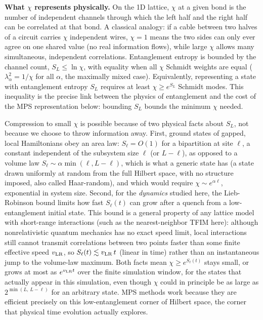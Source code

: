 \documentclass[11pt,a4paper]{article}
\begin{document}
\textbf{What $\chi$ represents physically.} On the 1D lattice, $\chi$ at a
given bond is the number of independent channels through which the left half
and the right half can be correlated at that bond. A classical analogy: if a
cable between two halves of a circuit carries $\chi$ independent wires,
$\chi=1$ means the two sides can only ever agree on one shared value (no real
information flows), while large $\chi$ allows many simultaneous, independent
correlations. Entanglement entropy is bounded by the channel count,
$S_L \leq \ln \chi$, with equality when all $\chi$ Schmidt weights are equal
($\lambda_\alpha^2 = 1/\chi$ for all $\alpha$, the maximally mixed case).
Equivalently, representing a state with entanglement entropy $S_L$ requires
at least $\chi \geq e^{S_L}$ Schmidt modes. This inequality is the precise
link between the physics of entanglement and the cost of the MPS
representation below: bounding $S_L$ bounds the minimum $\chi$ needed.

Compression to small $\chi$ is possible because of two physical facts about
$S_L$, not because we choose to throw information away. First, ground states
of gapped, local Hamiltonians obey an area law: $S_\ell = O(1)$ for a
bipartition at site $\ell$, a constant independent of the subsystem size
$\ell$ (or $L-\ell$), as opposed to a volume law $S_\ell \sim \alpha\min(\ell,
L-\ell)$, which is what a generic state has (a state drawn uniformly at
random from the full Hilbert space, with no structure imposed, also called
Haar-random), and which would require $\chi \sim e^{\alpha \ell}$,
exponential in system size. Second, for the \emph{dynamics} studied here,
the Lieb-Robinson bound limits how fast $S_\ell(t)$ can grow after a quench
from a low-entanglement initial state. This bound is a general property of
any lattice model with short-range interactions (such as the nearest-neighbor
TFIM here): although nonrelativistic quantum mechanics has no exact speed
limit, local interactions still cannot transmit correlations between two
points faster than some finite effective speed $v_{\rm LR}$, so
$S_\ell(t) \lesssim v_{\rm LR}\, t$ (linear in time) rather than an
instantaneous jump to the volume-law maximum. Both facts mean $\chi \geq
e^{S_\ell(t)}$ stays small, or grows at most as $e^{v_{\rm LR} t}$ over the
finite simulation window, for the states that actually appear in this
simulation, even though $\chi$ could in principle be as large as
$2^{\min(L,\,L-\ell)}$ for an arbitrary state. MPS methods work because they
are efficient precisely on this low-entanglement corner of Hilbert space,
the corner that physical time evolution actually explores.
\end{document}
